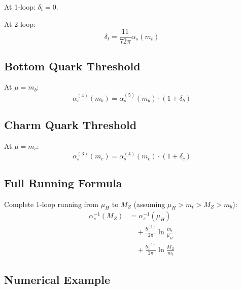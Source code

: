 \documentclass[11pt,a4paper]{article}
\theoremstyle{definition}
\begin{document}
At 1-loop: $\delta_t = 0$.

At 2-loop:
\begin{equation}
\label{eq:top-2loop}
\delta_t = \frac{11}{72\pi}\alpha_s(m_t)
\end{equation}

\subsection{Bottom Quark Threshold}
\label{subsec:bottom-threshold}

At $\mu = m_b$:
\begin{equation}
\label{eq:bottom-match}
\alpha_s^{(4)}(m_b) = \alpha_s^{(5)}(m_b) \cdot \left(1 + \delta_b\right)
\end{equation}

\subsection{Charm Quark Threshold}
\label{subsec:charm-threshold}

At $\mu = m_c$:
\begin{equation}
\label{eq:charm-match}
\alpha_s^{(3)}(m_c) = \alpha_s^{(4)}(m_c) \cdot \left(1 + \delta_c\right)
\end{equation}

\subsection{Full Running Formula}
\label{subsec:full-running}

Complete 1-loop running from $\mu_H$ to $M_Z$ (assuming $\mu_H > m_t > M_Z > m_b$):
\begin{align}
\label{eq:full-run-1}
\alpha_s^{-1}(M_Z) &= \alpha_s^{-1}(\mu_H) \\
\label{eq:full-run-2}
&\quad + \frac{b_0^{(6)}}{2\pi}\ln\frac{m_t}{\mu_H} \\
\label{eq:full-run-3}
&\quad + \frac{b_0^{(5)}}{2\pi}\ln\frac{M_Z}{m_t}
\end{align}

\subsection{Numerical Example}
\label{subsec:numerical-example}
\end{document}
